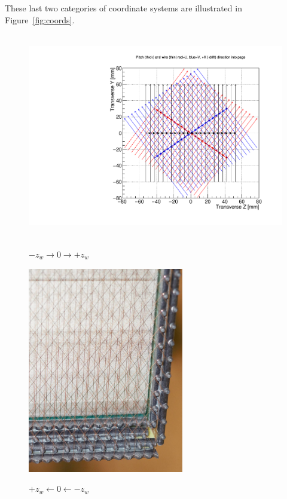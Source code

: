 \documentclass[pdftex,12pt,letter]{article}
\begin{document}
\noindent These last two categories of coordinate systems are illustrated in Figure~\ref{fig:coords}.

\begin{figure}[htp]
  \centering
  \begin{minipage}[t][10cm][t]{0.59\textwidth}
    \begin{center}
      \includegraphics[height=9cm]{test_pimpos_draw.pdf}

      $-z_w \longrightarrow 0 \longrightarrow +z_w$
    \end{center}
  \end{minipage}
  \begin{minipage}[t][10cm][t]{0.39\textwidth}
    \begin{center}
      \includegraphics[height=9cm]{others/APA1-wire-photo-bo-yu.jpg}
      
      $+z_w \longleftarrow 0 \longleftarrow -z_w$
    \end{center}
  \end{minipage}


\end{figure}
\end{document}

